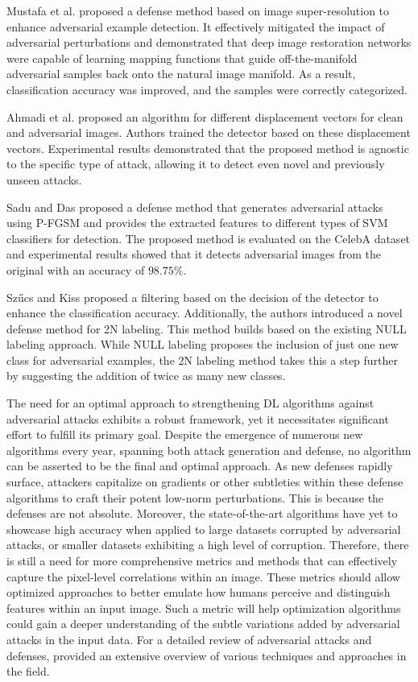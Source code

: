 \documentclass[sn-mathphys]{sn-jnl}%
\theoremstyle{thmstyleone}%
\theoremstyle{thmstyletwo}%
\theoremstyle{thmstylethree}%
\begin{document}
Mustafa et al. \cite{mustafa2019image} proposed a defense method based on image super-resolution to enhance adversarial example detection. It effectively mitigated the impact of adversarial perturbations and demonstrated that deep image restoration networks were capable of learning mapping functions that guide off-the-manifold adversarial samples back onto the natural image manifold. As a result, classification accuracy was improved, and the samples were correctly categorized.

Ahmadi et al. \cite{Ali2021} proposed an algorithm for different displacement vectors for clean and adversarial images. Authors trained the detector based on these displacement vectors. Experimental results demonstrated that the proposed method is agnostic to the specific type of attack, allowing it to detect even novel and previously unseen attacks. 

Sadu and Das \cite{sadu2021defense} proposed a defense method that generates adversarial attacks using P-FGSM and provides the extracted features to different types of SVM classifiers for detection. The proposed method is evaluated on the CelebA dataset and experimental results showed that it detects adversarial images from the original with an accuracy of $98.75\%$.

Szűcs and Kiss \cite{Gabor2023} proposed a filtering based on the decision of the detector to enhance the classification accuracy. Additionally, the authors introduced a novel defense method for 2N labeling. This method builds based on the existing NULL labeling approach. While NULL labeling proposes the inclusion of just one new class for adversarial examples, the 2N labeling method takes this a step further by suggesting the addition of twice as many new classes.

 The need for an optimal approach to strengthening DL algorithms against adversarial attacks exhibits a robust framework, yet it necessitates significant effort to fulfill its primary goal. Despite the emergence of numerous new algorithms every year, spanning both attack generation and defense, no algorithm can be asserted to be the final and optimal approach. As new defenses rapidly surface, attackers capitalize on gradients or other subtleties within these defense algorithms to craft their potent low-norm perturbations. This is because the defenses are not absolute. Moreover, the state-of-the-art algorithms have yet to showcase high accuracy when applied to large datasets corrupted by adversarial attacks, or smaller datasets exhibiting a high level of corruption. Therefore, there is still a need for more comprehensive metrics and methods that can effectively capture the pixel-level correlations within an image. These metrics should allow optimized approaches to better emulate how humans perceive and distinguish features within an input image. Such a metric will help optimization algorithms could gain a deeper understanding of the subtle variations added by adversarial attacks in the input data. For a detailed review of adversarial attacks and defenses, \cite{xu2020adversarial, Survey2021, Teng2022, Murali2023, Ashish2023} provided an extensive overview of various techniques and approaches in the field.
\end{document}
